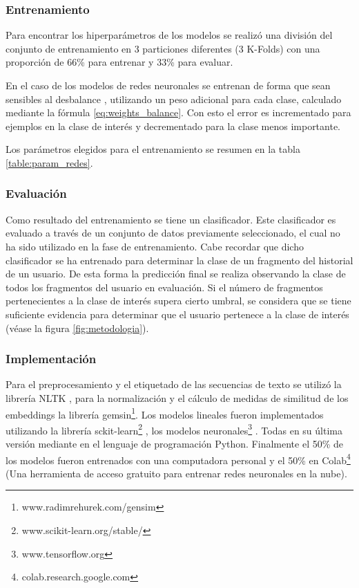 

\subsubsection{Entrenamiento}
Para encontrar los hiperparámetros de los modelos se realizó una división del conjunto de entrenamiento en 3 particiones diferentes (3 K-Folds) con una proporción de 66\% para entrenar y 33\% para evaluar.

En el caso de los modelos de redes neuronales se entrenan de forma que sean sensibles al desbalance \citep{wang2016training}, utilizando un peso adicional para cada clase, calculado mediante la fórmula \ref{eq:weights_balance}. Con esto el error es incrementado para ejemplos en la clase de interés y decrementado para la clase menos importante.

Los parámetros elegidos para el entrenamiento se resumen en la tabla \ref{table:param_redes}. 

\subsubsection{Evaluación}

Como resultado del entrenamiento se tiene un clasificador. Este clasificador es evaluado a través de un conjunto de datos previamente seleccionado, el cual no ha sido utilizado en la fase de entrenamiento. Cabe recordar que dicho clasificador se ha entrenado para determinar la clase de un fragmento del historial de un usuario. De esta forma la predicción final se realiza observando la clase de todos los fragmentos del usuario en evaluación. Si el número de fragmentos pertenecientes a la clase de interés supera cierto umbral, se considera que se tiene suficiente evidencia para determinar que el usuario pertenece a la clase de interés (véase la figura \ref{fig:metodologia}). 



\subsubsection{Implementación}
Para el preprocesamiento y el etiquetado de las secuencias de texto se utilizó la librería NLTK \citep{loper2002nltk}, para la normalización y el cálculo de medidas de similitud de los embeddings la librería gemsin\footnote{www.radimrehurek.com/gensim}.
Los modelos lineales fueron implementados utilizando la librería sckit-learn\footnote{www.scikit-learn.org/stable/} \citep{scikitlearn}, los modelos neuronales\footnote{www.tensorflow.org} \citep{tensorflow2015whitepaper}. Todas en su última versión mediante en el lenguaje de programación Python. Finalmente el 50\% de los modelos fueron entrenados con una computadora personal y el 50\% en Colab\footnote{colab.research.google.com} (Una herramienta de acceso gratuito para entrenar redes neuronales en la nube).
